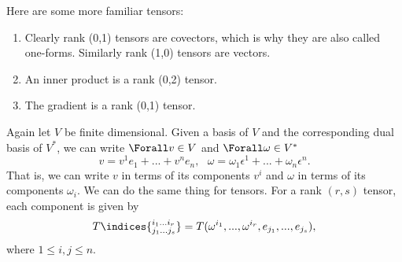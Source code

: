 \begin{example*}{}{}
 Here are some more familiar tensors:
  \begin{enumerate}
    \item Clearly rank (0,1) tensors are covectors, which is why they are 
          also called one-forms. Similarly rank (1,0) tensors are vectors.
    \item An inner product is a rank (0,2) tensor.
    \item The gradient is a rank (0,1) tensor.
  \end{enumerate}
\end{example*}
Again let $V$ be finite dimensional. Given a basis of $V$ and the corresponding
dual basis of $V^*$, we can write $\Forall v\in V$ and $\Forall \omega\in V^*$
\begin{equation}
  v=v^1e_1+...+v^ne_n,~~~\omega=\omega_1\epsilon^1+...+\omega_n\epsilon^n.
\end{equation}
That is, we can write $v$ in terms of its components $v^i$ and $\omega$ in
terms of its components $\omega_i$. We can do the same thing for tensors.
For a rank $(r,s)$ tensor, each component is given by
\begin{equation}
  T\indices{^{i_1...i_r}_{j_1...j_s}}
    =T(\omega^{i_1},...,\omega^{i_r},e_{j_1},...,e_{j_s}),
\end{equation}
where $1\leq i,j\leq n$.




